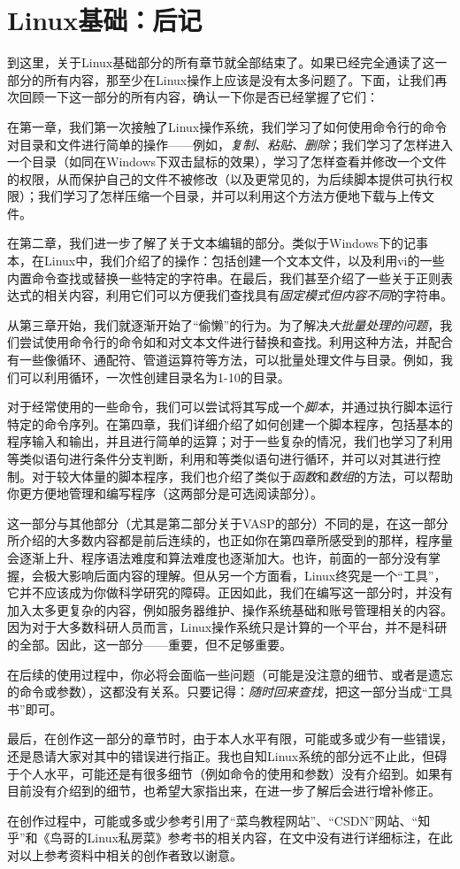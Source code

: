 \chapter*{Linux基础：后记}

到这里，关于Linux基础部分的所有章节就全部结束了。如果已经完全通读了这一部分的所有内容，那至少在Linux操作上应该是没有太多问题了。下面，让我们再次回顾一下这一部分的所有内容，确认一下你是否已经掌握了它们：

在第一章，我们第一次接触了Linux操作系统，我们学习了如何使用命令行的命令对目录和文件进行简单的操作——例如，\emph{复制、粘贴、删除}；我们学习了怎样进入一个目录（如同在Windows下双击鼠标的效果），学习了怎样查看并修改一个文件的权限，从而保护自己的文件不被修改（以及更常见的，为后续脚本提供可执行权限）；我们学习了怎样压缩一个目录，并可以利用这个方法方便地下载与上传文件。

在第二章，我们进一步了解了关于文本编辑的部分。类似于Windows下的记事本，在Linux中，我们介绍了的操作：包括创建一个文本文件，以及利用vi的一些内置命令查找或替换一些特定的字符串。在最后，我们甚至介绍了一些关于正则表达式的相关内容，利用它们可以方便我们查找具有\emph{固定模式但内容不同}的字符串。

从第三章开始，我们就逐渐开始了“偷懒”的行为。为了解决\emph{大批量处理的问题}，我们尝试使用命令行的命令如和对文本文件进行替换和查找。利用这种方法，并配合有一些像循环、通配符、管道运算符等方法，可以批量处理文件与目录。例如，我们可以利用循环，一次性创建目录名为1-10的目录。

对于经常使用的一些命令，我们可以尝试将其写成一个\emph{脚本}，并通过执行脚本运行特定的命令序列。在第四章，我们详细介绍了如何创建一个脚本程序，包括基本的程序输入和输出，并且进行简单的运算；对于一些复杂的情况，我们也学习了利用等类似语句进行条件分支判断，利用和等类似语句进行循环，并可以对其进行控制。对于较大体量的脚本程序，我们也介绍了类似于\emph{函数}和\emph{数组}的方法，可以帮助你更方便地管理和编写程序（这两部分是可选阅读部分）。

这一部分与其他部分（尤其是第二部分关于VASP的部分）不同的是，在这一部分所介绍的大多数内容都是前后连续的，也正如你在第四章所感受到的那样，程序量会逐渐上升、程序语法难度和算法难度也逐渐加大。也许，前面的一部分没有掌握，会极大影响后面内容的理解。但从另一个方面看，Linux终究是一个“工具”，它并不应该成为你做科学研究的障碍。正因如此，我们在编写这一部分时，并没有加入太多更复杂的内容，例如服务器维护、操作系统基础和账号管理相关的内容。因为对于大多数科研人员而言，Linux操作系统只是计算的一个平台，并不是科研的全部。因此，这一部分——重要，但不足够重要。

在后续的使用过程中，你必将会面临一些问题（可能是没注意的细节、或者是遗忘的命令或参数），这都没有关系。只要记得：\emph{随时回来查找}，把这一部分当成“工具书”即可。

最后，在创作这一部分的章节时，由于本人水平有限，可能或多或少有一些错误，还是恳请大家对其中的错误进行指正。我也自知Linux系统的部分远不止此，但碍于个人水平，可能还是有很多细节（例如命令的使用和参数）没有介绍到。如果有目前没有介绍到的细节，也希望大家指出来，在进一步了解后会进行增补修正。

在创作过程中，可能或多或少参考引用了“菜鸟教程网站”、“CSDN”网站、“知乎”和《鸟哥的Linux私房菜》参考书的相关内容，在文中没有进行详细标注，在此对以上参考资料中相关的创作者致以谢意。